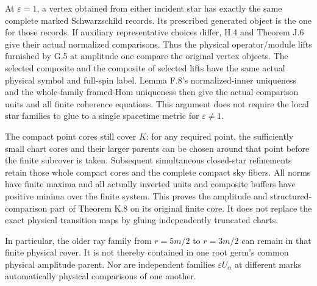 \documentclass[
  english,
  11pt,
  reqno]{amsart}
\begin{document}
At \(\varepsilon=1\), a vertex obtained from either incident star has
exactly the same complete marked Schwarzschild records. Its prescribed
generated object is the one for those records. If auxiliary
representative choices differ, H.4 and Theorem J.6 give their actual
normalized comparisons. Thus the physical operator/module lifts
furnished by G.5 at amplitude one compare the original vertex objects.
The selected composite and the composite of selected lifts have the same
actual physical symbol and full-spin label. Lemma F.8's normalized-inner
uniqueness and the whole-family framed-Hom uniqueness then give the
actual comparison units and all finite coherence equations. This
argument does not require the local star families to glue to a single
spacetime metric for \(\varepsilon\ne1\).

The compact point cores still cover \(K\): for any required point, the
sufficiently small chart cores and their larger parents can be chosen
around that point before the finite subcover is taken. Subsequent
simultaneous closed-star refinements retain those whole compact cores
and the complete compact sky fibers. All norms have finite maxima and
all actually inverted units and composite buffers have positive minima
over the finite system. This proves the amplitude and
structured-comparison part of Theorem K.8 on its original finite core.
It does not replace the exact physical transition maps by gluing
independently truncated charts.

In particular, the older ray family from \(r=5m/2\) to \(r=3m/2\) can
remain in that finite physical cover. It is not thereby contained in one
root germ's common physical amplitude parent. Nor are independent
families \(\varepsilon U_\alpha\) at different marks automatically
physical comparisons of one another.
\end{document}
